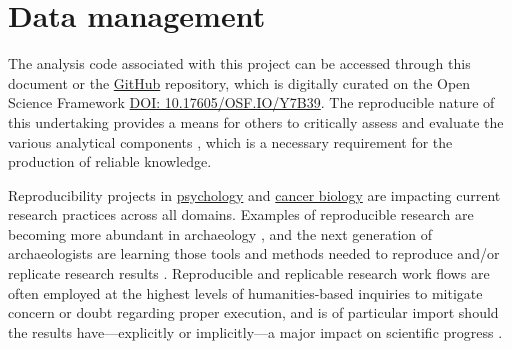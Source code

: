 \documentclass[]{interact}
\theoremstyle{plain}%
\theoremstyle{definition}
\theoremstyle{remark}
\begin{document}
\hypertarget{data-management}{%
\section*{Data management}\label{data-management}}

The analysis code associated with this project can be accessed through
this document or the
\href{https://github.com/seldenlab/gahaganmorph.3}{GitHub} repository,
which is digitally curated on the Open Science Framework
\href{https://osf.io/y7b39/}{DOI: 10.17605/OSF.IO/Y7B39}. The
reproducible nature of this undertaking provides a means for others to
critically assess and evaluate the various analytical components
\citep{RN8312,RN8313,RN8299}, which is a necessary requirement for the
production of reliable knowledge.

Reproducibility projects in \href{https://osf.io/ezcuj/}{psychology} and
\href{https://www.cos.io/rpcb}{cancer biology} are impacting current
research practices across all domains. Examples of reproducible research
are becoming more abundant in archaeology
\citep{RN8207,RN8965,RN8154,RN8318,RN9364}, and the next generation of
archaeologists are learning those tools and methods needed to reproduce
and/or replicate research results \citep{RN10760}. Reproducible and
replicable research work flows are often employed at the highest levels
of humanities-based inquiries to mitigate concern or doubt regarding
proper execution, and is of particular import should the results
have---explicitly or implicitly---a major impact on scientific progress
\citep{RN10761}.






\end{document}
